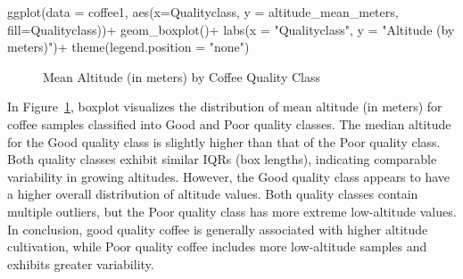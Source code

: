 \documentclass[
  letterpaper,
  DIV=11,
  numbers=noendperiod]{scrartcl}
\newenvironment{Shaded}{\begin{snugshade}}{\end{snugshade}}
\newcommand{\AttributeTok}[1]{\textcolor[rgb]{0.40,0.45,0.13}{#1}}
\newcommand{\FunctionTok}[1]{\textcolor[rgb]{0.28,0.35,0.67}{#1}}
\newcommand{\NormalTok}[1]{\textcolor[rgb]{0.00,0.23,0.31}{#1}}
\newcommand{\SpecialCharTok}[1]{\textcolor[rgb]{0.37,0.37,0.37}{#1}}
\newcommand{\StringTok}[1]{\textcolor[rgb]{0.13,0.47,0.30}{#1}}
\begin{document}
\begin{Shaded}
\begin{Highlighting}[]
\FunctionTok{ggplot}\NormalTok{(}\AttributeTok{data =}\NormalTok{ coffee1, }\FunctionTok{aes}\NormalTok{(}\AttributeTok{x=}\NormalTok{Qualityclass, }
                           \AttributeTok{y =}\NormalTok{ altitude\_mean\_meters, }
                           \AttributeTok{fill=}\NormalTok{Qualityclass))}\SpecialCharTok{+}
  \FunctionTok{geom\_boxplot}\NormalTok{()}\SpecialCharTok{+}
  \FunctionTok{labs}\NormalTok{(}\AttributeTok{x =} \StringTok{"Qualityclass"}\NormalTok{, }\AttributeTok{y =} \StringTok{"Altitude (by meters)"}\NormalTok{)}\SpecialCharTok{+}
  \FunctionTok{theme}\NormalTok{(}\AttributeTok{legend.position =} \StringTok{"none"}\NormalTok{)}
\end{Highlighting}
\end{Shaded}

\begin{figure}[H]


\caption{\label{fig-boxplot5}Mean Altitude (in meters) by Coffee Quality
Class}

\end{figure}%

In Figure~\ref{fig-boxplot5}, boxplot visualizes the distribution of
mean altitude (in meters) for coffee samples classified into Good and
Poor quality classes. The median altitude for the Good quality class is
slightly higher than that of the Poor quality class. Both quality
classes exhibit similar IQRs (box lengths), indicating comparable
variability in growing altitudes. However, the Good quality class
appears to have a higher overall distribution of altitude values. Both
quality classes contain multiple outliers, but the Poor quality class
has more extreme low-altitude values. In conclusion, good quality coffee
is generally associated with higher altitude cultivation, while Poor
quality coffee includes more low-altitude samples and exhibits greater
variability.
\end{document}
